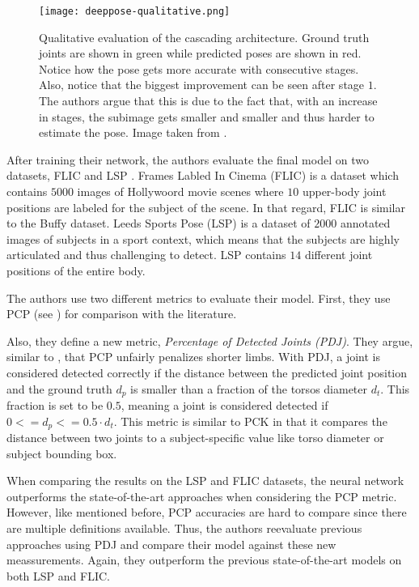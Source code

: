 \begin{figure}[htb!]
    \centering
    \texttt{[image: deeppose-qualitative.png]}
    \caption{Qualitative evaluation of the cascading architecture. Ground truth joints are shown in green while predicted poses are shown in red. Notice how the pose gets more accurate with consecutive stages. Also, notice that the biggest improvement can be seen after stage $1$. The authors argue that this is due to the fact that, with an increase in stages, the subimage gets smaller and smaller and thus harder to estimate the pose. Image taken from \cite{toshev_deeppose:_2014}.}
    \label{fig:deeppose-qualitative}
\end{figure}

\label{sec:flic-lsp}
After training their network, the authors evaluate the final model on two datasets, FLIC \cite{sapp_modec:_2013} and LSP \cite{johnson_clustered_2010}.
Frames Labled In Cinema (FLIC) is a dataset which contains $5000$ images of Hollywoord movie scenes where $10$ upper-body joint positions are labeled for the subject of the scene.
In that regard, FLIC is similar to the Buffy dataset.
Leeds Sports Pose (LSP) is a dataset of $2000$ annotated images of subjects in a sport context, which means that the subjects are highly articulated and thus challenging to detect.
LSP contains $14$ different joint positions of the entire body.

The authors use two different metrics to evaluate their model.
First, they use PCP (see ) for comparison with the literature.

Also, they define a new metric, \textit{Percentage of Detected Joints (PDJ)}.
They argue, similar to \cite{yang_articulated_2013}, that PCP unfairly penalizes shorter limbs.
With PDJ, a joint is considered detected correctly if the distance between the predicted joint position and the ground truth $d_p$ is smaller than a fraction of the torsos diameter $d_t$.
This fraction is set to be $0.5$, meaning a joint is considered detected if $0 <= d_p <= 0.5 \cdot d_t$.
This metric is similar to PCK in that it compares the distance between two joints to a subject-specific value like torso diameter or subject bounding box.

When comparing the results on the LSP and FLIC datasets, the neural network outperforms the state-of-the-art approaches when considering the PCP metric.
However, like mentioned before, PCP accuracies are hard to compare since there are multiple definitions available.
Thus, the authors reevaluate previous approaches using PDJ and compare their model against these new meassurements.
Again, they outperform the previous state-of-the-art models on both LSP and FLIC.

